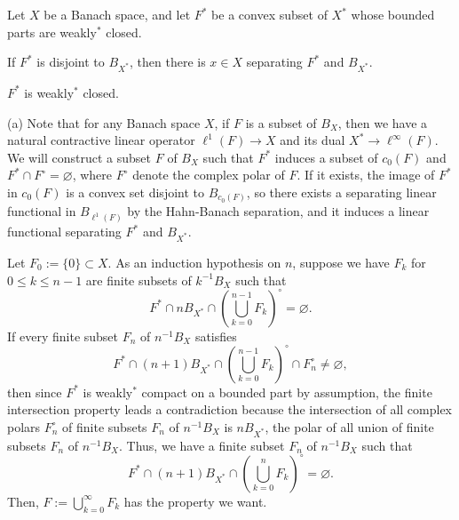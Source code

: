 \documentclass{../../large}
\begin{document}
\begin{prb}
\end{prb}
\begin{prb}
\end{prb}



\begin{prb}
Let $X$ be a Banach space, and let $F^*$ be a convex subset of $X^*$ whose bounded parts are weakly$^*$ closed.
\begin{parts}
\item If $F^*$ is disjoint to $B_{X^*}$, then there is $x\in X$ separating $F^*$ and $B_{X^*}$.
\item $F^*$ is weakly$^*$ closed.
\end{parts}
\end{prb}
\begin{pf}
(a)
Note that for any Banach space $X$, if $F$ is a subset of $B_X$, then we have a natural contractive linear operator $\ell^1(F)\to X$ and its dual $X^*\to\ell^\infty(F)$.
We will construct a subset $F$ of $B_X$ such that $F^*$ induces a subset of $c_0(F)$ and $F^*\cap F^\circ=\varnothing$, where $F^\circ$ denote the complex polar of $F$.
If it exists, the image of $F^*$ in $c_0(F)$ is a convex set disjoint to $B_{c_0(F)}$, so there exists a separating linear functional in $B_{\ell^1(F)}$ by the Hahn-Banach separation, and it induces a linear functional separating $F^*$ and $B_{X^*}$.

Let $F_0:=\{0\}\subset X$.
As an induction hypothesis on $n$, suppose we have $F_k$ for $0\le k\le n-1$ are finite subsets of $k^{-1}B_X$ such that
\[F^*\cap nB_{X^*}\cap\left(\bigcup_{k=0}^{n-1}F_k\right)^\circ=\varnothing.\]
If every finite subset $F_n$ of $n^{-1}B_X$ satisfies
\[F^*\cap(n+1)B_{X^*}\cap\left(\bigcup_{k=0}^{n-1}F_k\right)^\circ\cap F_n^\circ\ne\varnothing,\]
then since $F^*$ is weakly$^*$ compact on a bounded part by assumption, the finite intersection property leads a contradiction because the intersection of all complex polars $F_n^\circ$ of finite subsets $F_n$ of $n^{-1}B_X$ is $nB_{X^*}$, the polar of all union of finite subsets $F_n$ of $n^{-1}B_X$.
Thus, we have a finite subset $F_n$ of $n^{-1}B_X$ such that
\[F^*\cap(n+1)B_{X^*}\cap\left(\bigcup_{k=0}^nF_k\right)^\circ=\varnothing.\]
Then, $F:=\bigcup_{k=0}^\infty F_k$ has the property we want.

\end{pf}
\end{document}
